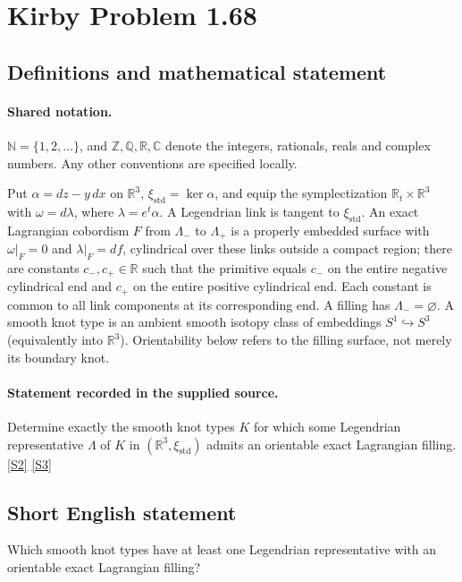 \documentclass[11pt]{article}
\newcommand{\sref}[2]{\hyperlink{source:#1:#2}{[S#2]}}
\begin{document}
\section{Kirby Problem 1.68}\label{statement}

\subsection{Definitions and mathematical statement}

\paragraph{Shared notation.}$\mathbb N=\{1,2,\ldots\}$, and $\mathbb Z,\mathbb Q,\mathbb R,\mathbb C$ denote the integers, rationals, reals and complex numbers. Any other conventions are specified locally.


Put $\alpha=dz-y\,dx$ on $\mathbb R^3$, $\xi_{\mathrm{std}}=\ker\alpha$, and equip the symplectization $\mathbb R_t\times\mathbb R^3$ with $\omega=d\lambda$, where $\lambda=e^t\alpha$. A Legendrian link is tangent to $\xi_{\mathrm{std}}$. An exact Lagrangian cobordism $F$ from $\Lambda_-$ to $\Lambda_+$ is a properly embedded surface with $\omega|_F=0$ and $\lambda|_F=df$, cylindrical over these links outside a compact region; there are constants $c_-,c_+\in\mathbb R$ such that the primitive equals $c_-$ on the entire negative cylindrical end and $c_+$ on the entire positive cylindrical end. Each constant is common to all link components at its corresponding end. A filling has $\Lambda_-=\varnothing$. A smooth knot type is an ambient smooth isotopy class of embeddings $S^1\hookrightarrow S^3$ (equivalently into $\mathbb R^3$). Orientability below refers to the filling surface, not merely its boundary knot.
\paragraph{Statement recorded in the supplied source.}
Determine exactly the smooth knot types $K$ for which some Legendrian representative $\Lambda$ of $K$ in $(\mathbb R^3,\xi_{\mathrm{std}})$ admits an orientable exact Lagrangian filling. \sref{statement}{2} \sref{statement}{3}

\subsection{Short English statement}
Which smooth knot types have at least one Legendrian representative with an orientable exact Lagrangian filling?
\end{document}
